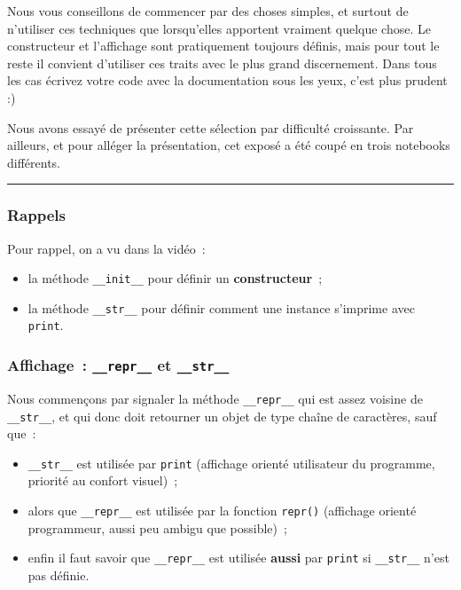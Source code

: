     Nous vous conseillons de commencer par des choses simples, et surtout de
n'utiliser ces techniques que lorsqu'elles apportent vraiment quelque
chose. Le constructeur et l'affichage sont pratiquement toujours
définis, mais pour tout le reste il convient d'utiliser ces traits avec
le plus grand discernement. Dans tous les cas écrivez votre code avec la
documentation sous les yeux, c'est plus prudent :)

    Nous avons essayé de présenter cette sélection par difficulté
croissante. Par ailleurs, et pour alléger la présentation, cet exposé a
été coupé en trois notebooks différents.

    \begin{center}\rule{0.5\linewidth}{\linethickness}\end{center}

    \hypertarget{rappels}{%
\subsubsection{Rappels}\label{rappels}}

    Pour rappel, on a vu dans la vidéo~:

\begin{itemize}
\tightlist
\item
  la méthode \texttt{\_\_init\_\_} pour définir un
  \textbf{constructeur}~;
\item
  la méthode \texttt{\_\_str\_\_} pour définir comment une instance
  s'imprime avec \texttt{print}.
\end{itemize}

    \hypertarget{affichage-__repr__-et-__str__}{%
\subsubsection{\texorpdfstring{Affichage~: \texttt{\_\_repr\_\_} et
\texttt{\_\_str\_\_}}{Affichage~: \_\_repr\_\_ et \_\_str\_\_}}\label{affichage-__repr__-et-__str__}}

    Nous commençons par signaler la méthode \texttt{\_\_repr\_\_} qui est
assez voisine de \texttt{\_\_str\_\_}, et qui donc doit retourner un
objet de type chaîne de caractères, sauf que~:

\begin{itemize}
\tightlist
\item
  \texttt{\_\_str\_\_} est utilisée par \texttt{print} (affichage
  orienté utilisateur du programme, priorité au confort visuel)~;
\item
  alors que \texttt{\_\_repr\_\_} est utilisée par la fonction
  \texttt{repr()} (affichage orienté programmeur, aussi peu ambigu que
  possible)~;
\item
  enfin il faut savoir que \texttt{\_\_repr\_\_} est utilisée
  \textbf{aussi} par \texttt{print} si \texttt{\_\_str\_\_} n'est pas
  définie.
\end{itemize}


